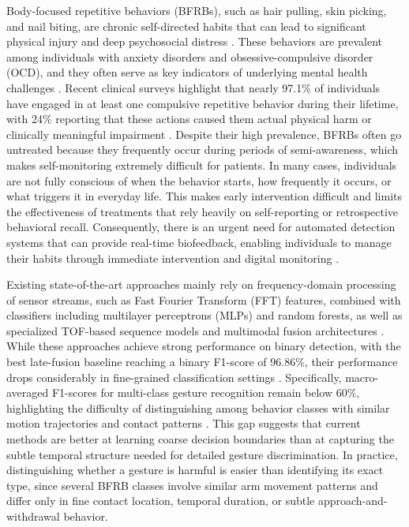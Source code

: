 \documentclass[conference]{IEEEtran}
\begin{document}
Body-focused repetitive behaviors (BFRBs), such as hair pulling, skin picking, and nail biting, are chronic self-directed habits that can lead to significant physical injury and deep psychosocial distress \cite{woods2022prevalence}. These behaviors are prevalent among individuals with anxiety disorders and obsessive-compulsive disorder (OCD), and they often serve as key indicators of underlying mental health challenges \cite{stein2019ocd}. Recent clinical surveys highlight that nearly 97.1\% of individuals have engaged in at least one compulsive repetitive behavior during their lifetime, with 24\% reporting that these actions caused them actual physical harm or clinically meaningful impairment \cite{stein2019ocd}. Despite their high prevalence, BFRBs often go untreated because they frequently occur during periods of semi-awareness, which makes self-monitoring extremely difficult for patients. In many cases, individuals are not fully conscious of when the behavior starts, how frequently it occurs, or what triggers it in everyday life. This makes early intervention difficult and limits the effectiveness of treatments that rely heavily on self-reporting or retrospective behavioral recall. Consequently, there is an urgent need for automated detection systems that can provide real-time biofeedback, enabling individuals to manage their habits through immediate intervention and digital monitoring \cite{lee2023bfrb}.


Existing state-of-the-art approaches mainly rely on frequency-domain processing of sensor streams, such as Fast Fourier Transform (FFT) features, combined with classifiers including multilayer perceptrons (MLPs) and random forests, as well as specialized TOF-based sequence models and multimodal fusion architectures \cite{zhang2025baseline}. While these approaches achieve strong performance on binary detection, with the best late-fusion baseline reaching a binary F1-score of 96.86\%, their performance drops considerably in fine-grained classification settings \cite{zhang2025baseline}. Specifically, macro-averaged F1-scores for multi-class gesture recognition remain below 60\%, highlighting the difficulty of distinguishing among behavior classes with similar motion trajectories and contact patterns \cite{zhang2025baseline}. This gap suggests that current methods are better at learning coarse decision boundaries than at capturing the subtle temporal structure needed for detailed gesture discrimination. In practice, distinguishing whether a gesture is harmful is easier than identifying its exact type, since several BFRB classes involve similar arm movement patterns and differ only in fine contact location, temporal duration, or subtle approach-and-withdrawal behavior.
\end{document}
